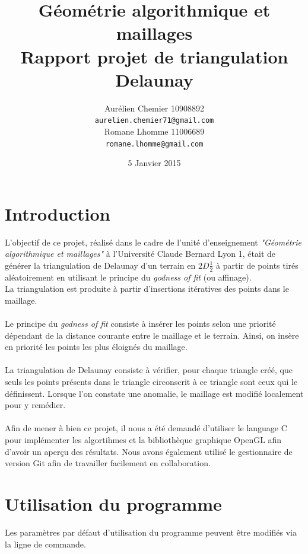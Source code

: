 \documentclass{article}
\title{Géométrie algorithmique et maillages \\
        Rapport projet de triangulation Delaunay}
\author{Aurélien Chemier 10908892 \\\texttt{aurelien.chemier71@gmail.com} \\
        Romane Lhomme 11006689  \\\texttt{romane.lhomme@gmail.com} }
\date{5 Janvier 2015}
\begin{document}
\maketitle
\tableofcontents
\newpage

\section{Introduction}
    L'objectif de ce projet, réalisé dans le cadre de l'unité d'enseignement \textit{"Géométrie algorithmique et maillages"} à l'Université Claude Bernard Lyon 1, était de générer la triangulation de Delaunay d'un terrain en $2D\frac{1}{2}$ à partir de points tirés aléatoirement en utilisant le principe du \textit{godness of fit} (ou affinage).
    \\La triangulation est produite à partir d'insertions itératives des points dans le maillage.
    
    \paragraph{}
    Le principe du \textit{godness of fit} consiste à insérer les points selon une priorité dépendant de la distance courante entre le maillage et le terrain. Ainsi, on insère en priorité les points les plus éloignés du maillage.
    
    \paragraph{}
    La triangulation de Delaunay consiste à vérifier, pour chaque triangle créé, que seuls les points présents dans le triangle circonscrit à ce triangle sont ceux qui le définissent. Lorsque l'on constate une anomalie, le maillage est modifié localement pour y remédier.
    
    \paragraph{}
    Afin de mener à bien ce projet, il nous a été demandé d'utiliser le language C pour implémenter les algortihmes et la bibliothèque graphique OpenGL afin d'avoir un aperçu des résultats. Nous avons également utilisé le gestionnaire de version Git afin de travailler facilement en collaboration.
    
\section{Utilisation du programme}
    Les paramètres par défaut d'utilisation du programme peuvent être modifiés via la ligne de commande.
    
\end{document}
